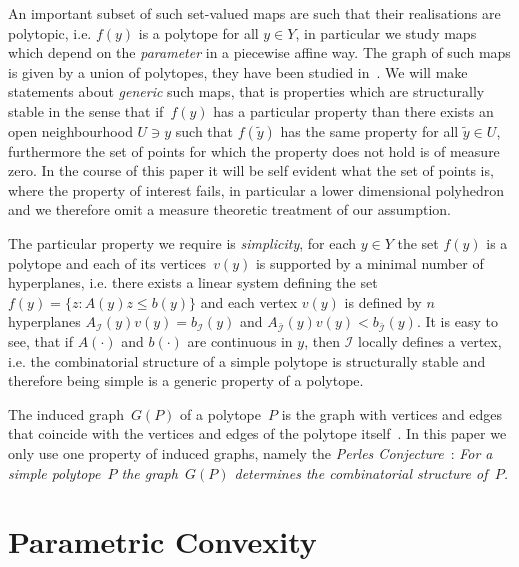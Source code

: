 \documentclass[final]{elsarticle}
\theoremstyle{remark}
\theoremstyle{definition}
\begin{document}
An important subset of such set-valued maps are such that their realisations are polytopic, i.e. $f(y)$ is a polytope for all $y\in Y$, in particular we study maps which depend on the \emph{parameter} in a piecewise affine way.
%
The graph of such maps is given by a union of polytopes, they have been studied in~\cite{Finzel:2000}.
%
We will make statements about \emph{generic} such maps, that is properties which are structurally stable in the sense that if~$f(y)$ has a particular property than there exists an open neighbourhood $U\ni y$ such that $f(\tilde y)$ has the same property for all $\tilde y\in U$, furthermore the set of points for which the property does not hold is of measure zero.
%
In the course of this paper it will be self evident what the set of points is, where the property of interest fails, in particular a lower dimensional polyhedron and we therefore omit a measure theoretic treatment of our assumption.

The particular property we require is \emph{simplicity}, for each $y\in Y$ the set $f(y)$ is a polytope and each of its vertices~$v(y)$ is supported by a minimal number of hyperplanes, i.e. there exists a linear system defining the set~$f(y) = \{z:A(y)z\leq b(y)\}$ and each vertex $v(y)$ is defined by $n$ hyperplanes $A_{\mathcal I}(y)v(y)=b_{\mathcal I}(y)$ and $A_{\bar{\mathcal I}}(y)v(y)<b_{\bar{\mathcal I}}(y)$.
%
It is easy to see, that if $A(\cdot)$ and $b(\cdot)$ are continuous in $y$, then $\mathcal I$ locally defines a vertex, i.e. the combinatorial structure of a simple polytope is structurally stable and therefore being simple is a generic property of a polytope.


The induced graph~$G(P)$ of a polytope~$P$ is the graph with vertices and edges that coincide with the vertices and edges of the polytope itself~\cite{Bondy:2008}.
%
In this paper we only use one property of induced graphs, namely the \emph{Perles Conjecture}~\cite{Kalai:1988}:
\emph{For a simple polytope~$P$ the graph~$G(P)$ determines the combinatorial structure of~$P$.}

\section{Parametric Convexity}\label{sec:parametric:convexity}
\end{document}
